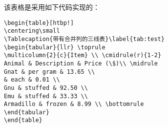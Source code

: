该表格是采用如下代码实现的：
\begin{verbatim}
\begin{table}[htbp!]
\centering\small
\Tablecaption{带有合并列的三线表}\label{tab:test}
\begin{tabular}{llr} \toprule
\multicolumn{2}{c}{Item} \\ \cmidrule(r){1-2}
Animal & Description & Price (\$)\\ \midrule
Gnat & per gram & 13.65 \\
& each & 0.01 \\
Gnu & stuffed & 92.50 \\
Emu & stuffed & 33.33 \\
Armadillo & frozen & 8.99 \\ \bottomrule
\end{tabular}
\end{table}
\end{verbatim}


